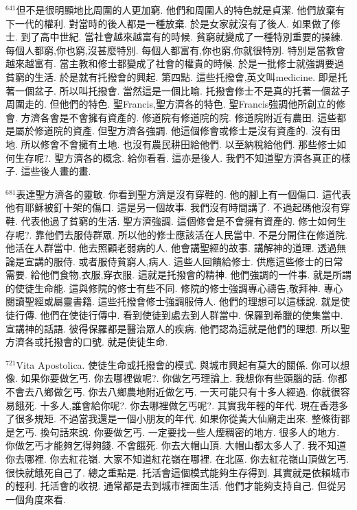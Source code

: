\documentclass{book}
\begin{document}
$^{641}$但不是很明顯地比周圍的人更加窮.
他們和周圍人的特色就是貞潔.
他們放棄有下一代的權利.
對當時的後人都是一種放棄.
於是女家就沒有了後人.
如果做了修士.
到了高中世紀.
當社會越來越富有的時候.
貧窮就變成了一種特別重要的操練.
每個人都窮,你也窮,沒甚麼特別.
每個人都富有,你也窮,你就很特別.
特別是當教會越來越富有.
當主教和修士都變成了社會的權貴的時候.
於是一批修士就強調要過貧窮的生活.
於是就有托撥會的興起.
第四點.
這些托撥會,英文叫medicine.
即是托著一個盆子.
所以叫托撥會.
當然這是一個比喻.
托撥會修士不是真的托著一個盆子周圍走的.
但他們的特色.
聖Francis,聖方濟各的特色.
聖Francis強調他所創立的修會.
方濟各會是不會擁有資產的.
修道院有修道院的院.
修道院附近有農田.
這些都是屬於修道院的資產.
但聖方濟各強調.
他這個修會或修士是沒有資產的.
沒有田地.
所以修會不會擁有土地.
也沒有農民耕田給他們.
以至納稅給他們.
那些修士如何生存呢?.
聖方濟各的概念.
給你看看.
這亦是後人.
我們不知道聖方濟各真正的樣子.
這些後人畫的畫.

$^{681}$表達聖方濟各的靈敏.
你看到聖方濟是沒有穿鞋的.
他的腳上有一個傷口.
這代表他有耶穌被釘十架的傷口.
這是另一個故事.
我們沒有時間講了.
不過起碼他沒有穿鞋.
代表他過了貧窮的生活.
聖方濟強調.
這個修會是不會擁有資產的.
修士如何生存呢?.
靠他們去服侍群眾.
所以他的修士應該活在人民當中.
不是分開住在修道院.
他活在人群當中.
他去照顧老弱病的人.
他會講聖經的故事.
講解神的道理.
透過無論是宣講的服侍.
或者服侍貧窮人,病人.
這些人回饋給修士.
供應這些修士的日常需要.
給他們食物,衣服,穿衣服.
這就是托撥會的精神.
他們強調的一件事.
就是所謂的使徒生命能.
這與修院的修士有些不同.
修院的修士強調專心禱告,敬拜神.
專心閱讀聖經或屬靈書籍.
這些托撥會修士強調服侍人.
他們的理想可以這樣說.
就是使徒行傳.
他們在使徒行傳中.
看到使徒到處去到人群當中.
保羅到希臘的使集當中.
宣講神的話語.
彼得保羅都是醫治眾人的疾病.
他們認為這就是他們的理想.
所以聖方濟各或托撥會的口號.
就是使徒生命.

$^{721}$Vita Apostolica.
使徒生命或托撥會的模式.
與城市興起有莫大的關係.
你可以想像.
如果你要做乞丐.
你去哪裡做呢?.
你做乞丐理論上.
我想你有些頭腦的話.
你都不會去八鄉做乞丐.
你去八鄉農地附近做乞丐.
一天可能只有十多人經過.
你就很容易餓死.
十多人,誰會給你呢?.
你去哪裡做乞丐呢?.
其實我年輕的年代.
現在香港多了很多規矩.
不過當我還是一個小朋友的年代.
如果你從黃大仙廟走出來.
整條街都是乞丐.
換句話來說.
你要做乞丐.
一定要找一些人煙稠密的地方.
很多人的地方.
你做乞丐才能夠乞得夠錢.
不會餓死.
你去大帽山頂.
大帽山都太多人了.
我不知道你去哪裡.
你去紅花嶺.
大家不知道紅花嶺在哪裡.
在北區.
你去紅花嶺山頂做乞丐.
很快就餓死自己了.
總之重點是.
托活會這個模式能夠生存得到.
其實就是依賴城市的輕利.
托活會的收視.
通常都是去到城市裡面生活.
他們才能夠支持自己.
但從另一個角度來看.
\end{document}
